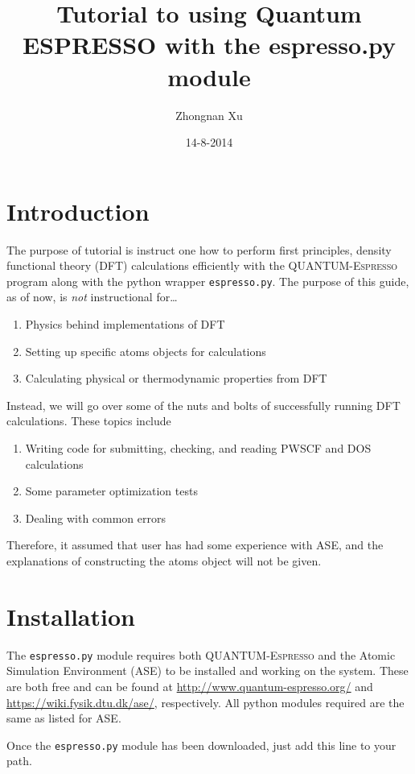 \documentclass[colorlinks=true,urlcolor=blue,linkcolor=blue,citecolor=red]{article}
\author{Zhongnan Xu}
\date{14-8-2014}
\title{Tutorial to using Quantum ESPRESSO with the espresso.py module}
\begin{document}
\maketitle
\tableofcontents

\section{Introduction}
\label{sec-1}
The purpose of tutorial is instruct one how to perform first principles, density functional theory (DFT) calculations efficiently with the \textsc{QUANTUM-Espresso} program along with the python wrapper \texttt{espresso.py}. The purpose of this guide, as of now, is \emph{not} instructional for\ldots{}

\begin{enumerate}
\item Physics behind implementations of DFT
\item Setting up specific atoms objects for calculations
\item Calculating physical or thermodynamic properties from DFT
\end{enumerate}

Instead, we will go over some of the nuts and bolts of successfully running DFT calculations. These topics include

\begin{enumerate}
\item Writing code for submitting, checking, and reading PWSCF and DOS calculations
\item Some parameter optimization tests
\item Dealing with common errors
\end{enumerate}

Therefore, it assumed that user has had some experience with ASE, and the explanations of constructing the atoms object will not be given.

\section{Installation}
\label{sec-2}
The \texttt{espresso.py} module requires both \textsc{QUANTUM-Espresso} and the Atomic Simulation Environment (ASE) to be installed and working on the system. These are both free and can be found at \url{http://www.quantum-espresso.org/} and \url{https://wiki.fysik.dtu.dk/ase/}, respectively. All python modules required are the same as listed for ASE.

Once the \texttt{espresso.py} module has been downloaded, just add this line to your path.
\end{document}
